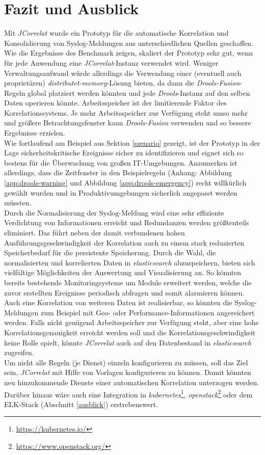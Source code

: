 \chapter{Fazit und Ausblick}
\thispagestyle{fancy}

Mit \textit{JCorrelat} wurde ein Prototyp für die automatische Korrelation und 
Konsolidierung von Syslog-Meldungen aus unterschiedlichen Quellen geschaffen. Wie die 
Ergebnisse des Benchmark zeigen, skaliert der Prototyp sehr gut, wenn für jede Anwendung 
eine \textit{JCorrelat}-Instanz verwendet wird. Weniger Verwaltungsaufwand würde 
allerdings die Verwendung einer (eventuell auch proprietären) 
\textit{distributet-memory}-Lösung bieten, da dann die \textit{Drools-Fusion}-Regeln 
global platziert werden könnten und jede \textit{Drools}-Instanz auf den selben Daten 
operieren könnte. Arbeitsspeicher ist der limitierende Faktor des Korrelationssystems. Je 
mehr Arbeitsspeicher zur Verfügung steht umso mehr und größere Betrachtungsfenster kann 
\textit{Drools-Fusion} verwenden und so bessere Ergebnisse erzielen.\\
Wie fortlaufend am Beispiel aus Sektion \ref{szenario} gezeigt, ist der Prototyp in der 
Lage sicherheitskritische Ereignisse sicher zu identifizieren und eignet sich so bestens 
für die Überwachung von großen IT-Umgebungen. Anzumerken ist allerdings, dass die 
Zeitfenster in den Beispielregeln (Anhang: Abbildung \ref{app:drools-warning} und 
Abbildung \ref{app:drools-emergency}) recht willkürlich gewählt wurden und in 
Produktivumgebungen sicherlich angepasst werden müssten.\\

Durch die Normalisierung der Syslog-Meldung wird eine sehr effiziente Verdichtung von 
Informationen erreicht und Redundanzen werden größtenteils eliminiert. Das führt neben 
der damit verbundenen hohen Ausführungsgeschwindigkeit der Korrelation auch zu einem 
stark reduzierten Speicherbedarf für die persistente Speicherung. Durch die Wahl, die 
normalisierten und korrelierten Daten in \textit{elasticsearch} abzuspeichern, bieten 
sich vielfältige Möglichkeiten der Auswertung und Visualisierung an. So könnten bereits 
bestehende Monitoringsysteme um Module erweitert werden, welche die zuvor erstellten 
Ereignisse periodisch abfragen und somit alarmieren können.\\

Auch eine Korrelation von weiteren Daten ist realisierbar, so könnten die 
Syslog-Meldungen zum Beispiel mit Geo- oder Performance-Informationen angereichert 
werden. Falls nicht genügend Arbeitsspeicher zur Verfügung steht, aber eine hohe 
Korrelationsgenauigkeit erreicht werden soll und die Korrelationsgeschwindigkeit keine 
Rolle spielt, könnte \textit{JCorrelat} auch auf den Datenbestand in 
\textit{elasticsearch} zugreifen.\\
Um nicht alle Regeln (je Dienst) einzeln konfigurieren zu müssen, soll das Ziel sein, 
\textit{JCorrelat} mit Hilfe von Vorlagen konfigurieren zu können. Damit könnten neu 
hinzukommende Dienste einer automatischen Korrelation unterzogen werden. Darüber hinaus 
wäre auch eine Integration in \textit{kubernetes}\footnote{\url{https://kubernetes.io/}}, 
\textit{openstack}\footnote{\url{https://www.openstack.org/}} oder dem ELK-Stack 
(Abschnitt \ref{ausblick}) erstrebenswert. 